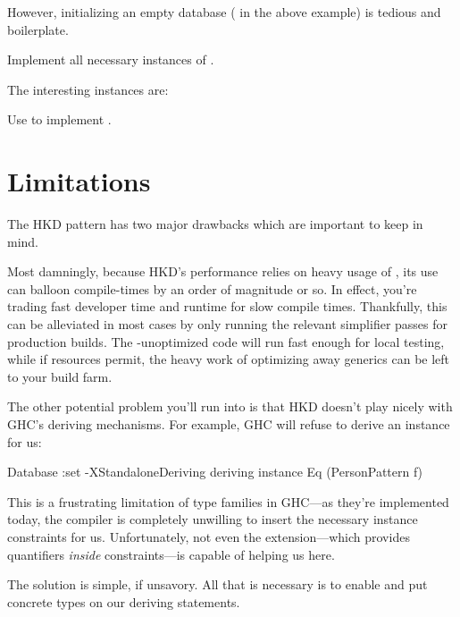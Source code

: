 \documentclass[book.tex]{subfiles}
\begin{document}
However, initializing an empty database ( in the above example) is
tedious and boilerplate.


\begin{exercise}
Implement all necessary instances of .
\end{exercise}
\begin{solution}
The interesting instances are:
\end{solution}

\begin{exercise}
Use  to implement .
\end{exercise}
\begin{solution}
\end{solution}


\section{Limitations}

The HKD pattern has two major drawbacks which are important to keep in mind.

Most damningly, because HKD's performance relies on heavy usage of
, its use can balloon compile-times by an order of magnitude or
so. In effect, you're trading fast developer time and runtime for slow compile
times. Thankfully, this can be alleviated in most cases by only running the
relevant simplifier passes for production builds. The
-unoptimized code will run fast enough for local testing, while
if resources permit, the heavy work of optimizing away generics can be left to
your build farm.

The other potential problem you'll run into is that HKD doesn't play nicely with
GHC's deriving mechanisms. For example, GHC will refuse to derive an 
instance for us:

\begin{dorepl}{Database}
:set -XStandaloneDeriving
deriving instance Eq (PersonPattern f)
\end{dorepl}

This is a frustrating limitation of type families in GHC---as they're
implemented today, the compiler is completely unwilling to insert the necessary
instance constraints for us. Unfortunately, not even the
 extension---which provides quantifiers \emph{inside}
constraints---is capable of helping us here.

The solution is simple, if unsavory. All that is necessary is to enable
 and put concrete types on our deriving statements.

\end{document}
